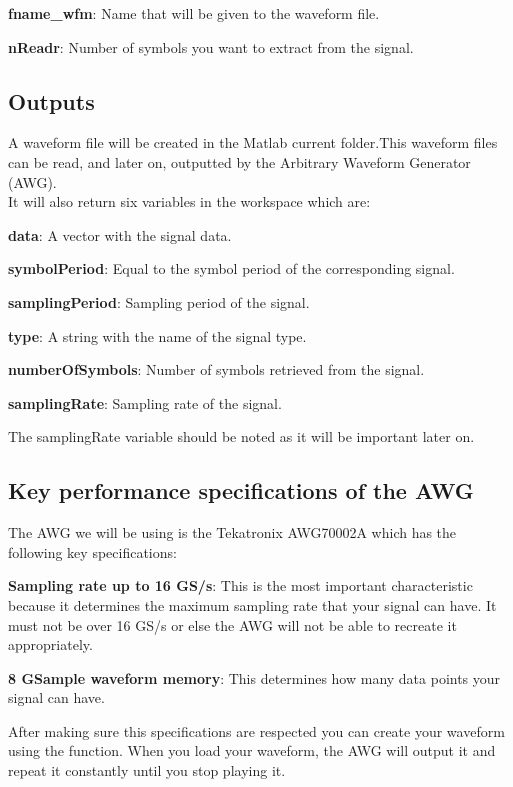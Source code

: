 \textbf{fname\_wfm}: Name that will be given to the waveform file.
\bigskip

\textbf{nReadr}: Number of symbols you want to extract from the signal.

\subsection*{Outputs}
A waveform file will be created in the Matlab current folder.This waveform files can be read, and later on, outputted by the Arbitrary Waveform Generator (AWG). \\
It will also return six variables in the workspace which are:
\bigskip

\textbf{data}: A vector with the signal data.
\bigskip

\textbf{symbolPeriod}: Equal to the symbol period of the corresponding signal.
\bigskip

\textbf{samplingPeriod}: Sampling period of the signal.
\bigskip

\textbf{type}: A string with the name of the signal type.
\bigskip

\textbf{numberOfSymbols}: Number of symbols retrieved from the signal.
\bigskip

\textbf{samplingRate}: Sampling rate of the signal.
\bigskip

\noindent
The samplingRate variable  should be noted as it will be important later on.

\subsection*{Key performance specifications of the AWG}

The AWG we will be using is the Tekatronix AWG70002A which has the following key specifications:
\bigskip

\textbf{Sampling rate up to 16 GS/s}: This is the most important characteristic  because it determines the maximum sampling rate that your signal can have. It must not be over 16 GS/s or else the AWG will not be able to recreate it appropriately.
\bigskip

\textbf{8 GSample waveform memory}: This determines how many data points your signal can have. 
\bigskip


After making sure this specifications are respected you can create your waveform using the function. When you load your waveform, the AWG will output it and repeat it constantly until you stop playing it.


